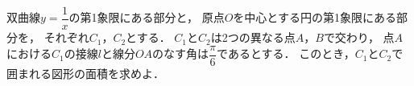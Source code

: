 \documentclass[../../main.tex]{subfiles}
\begin{document}
双曲線$\displaystyle y=\dfrac{1}{x}$の第1象限にある部分と，
原点$O$を中心とする円の第1象限にある部分を，
それぞれ$C_1$，$C_2$とする．
$C_1$と$C_2$は2つの異なる点$A$，$B$で交わり，
点$A$における$C_1$の接線$l$と線分$OA$のなす角は$\displaystyle\dfrac{\pi}{6}$であるとする．
このとき，$C_1$と$C_2$で囲まれる図形の面積を求めよ．
\end{document}
